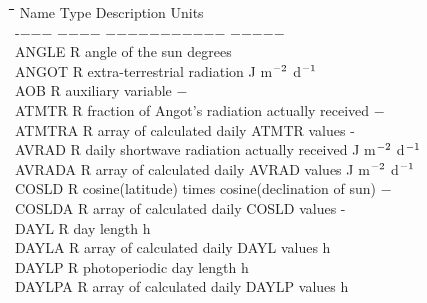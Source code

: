 \begin{tabbing}
\hspace{1.27cm}\=\hspace{1.27cm}\=\hspace{1.27cm}\=\hspace{1.27cm}\=%
\hspace{1.27cm}\=\hspace{1.27cm}\=\hspace{1.27cm}\=\hspace{1.27cm}\=%
\hspace{1.27cm}\=\hspace{1.27cm}\=\kill
Name    \> \> Type\> Description                    \> \> \> \> \>    \> \> Units\\
-$-$$-$$-$    \> \> $-$$-$$-$$-$\> $-$$-$$-$$-$$-$$-$$-$$-$$-$$-$$-$                \> \> \>           \> \> \> \> $-$$-$$-$$-$$-$\\
ANGLE   \> \> R   \> angle of the sun                          \> \> \> \> \> \> \> degrees\\
ANGOT\> \> R\> extra-terrestrial radiation\> \> \> \> \> \> \> J m$^{{\rm -2}}$ d$^{{\rm -1}}$\\
AOB     \> \> R\> auxiliary variable                            \> \> \> \> \> \> \> $-$\\
ATMTR   \> \> R   \> fraction of Angot's radiation actually received    \> \> \> \> \> \> \> $-$\\
ATMTRA\> \> R\> array of calculated daily ATMTR values\> \> \> \> \> \> \> -\\
AVRAD\> \> R\> daily shortwave radiation actually received\> \> \> \> \> \> \> J m$^{{\rm -2}}$ d$^{{\rm -1}}$\\
AVRADA\> \> R\> array of calculated daily AVRAD values\> \> \> \> \> \> \> J m$^{{\rm -2}}$ d$^{{\rm -1}}$\\
COSLD   \> \> R  \> cosine(latitude) times cosine(declination of sun)\> \> \> \> \> \> \> $-$\\
COSLDA\> \> R\> array of calculated daily COSLD values\> \> \> \> \> \> \> -\\
DAYL \> \> R \> day length                              \> \> \> \> \> \> \> h\\
DAYLA\> \> R\> array of calculated daily DAYL values\> \> \> \> \> \> \> h\\
DAYLP   \> \> R \> photoperiodic day length                 \> \> \> \> \> \> \> h\\
DAYLPA\> \> R\> array of calculated daily DAYLP values\> \> \> \> \> \> \> h\\
$$
\end{tabbing}
